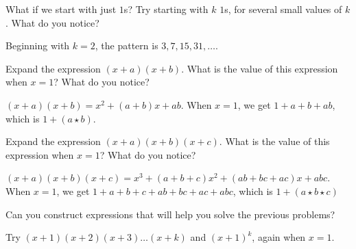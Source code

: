 \documentclass{ximera}
\begin{document}
\begin{problem}
What if we start with just $1$s?  Try starting with $k$ $1$s, for several small values of $k$.  What do you notice?  
\begin{freeResponse}
Beginning with $k=2$, the pattern is $3, 7, 15, 31, \dots$.  
\end{freeResponse}
\end{problem}

\newpage 

\begin{problem}
Expand the expression $(x+a)(x+b)$.  What is the value of this expression when $x=1$?  What do you notice?
\begin{freeResponse}
$(x+a)(x+b) = x^2+ (a+b)x+ab$.  When $x=1$, we get $1+a+b+ab$, which is $1+(a\star b)$.  
\end{freeResponse}
\end{problem}

\begin{problem}
Expand the expression $(x+a)(x+b)(x+c)$.  What is the value of this expression when $x=1$?  What do you notice?
\begin{freeResponse}
$(x+a)(x+b)(x+c) = x^3+ (a+b+c)x^2+(ab+bc+ac)x+abc$.  When $x=1$, we get $1+a+b+c+ab+bc+ac+abc$, 
which is $1+(a\star b\star c)$
\end{freeResponse}
\end{problem}

\begin{problem}
Can you construct expressions that will help you solve the previous problems?  
\begin{freeResponse}
Try $(x+1)(x+2)(x+3)\dots(x+k)$ and $(x+1)^k$, again when $x=1$.  
\end{freeResponse}
\end{problem}
\end{document}
